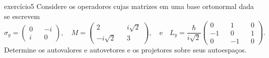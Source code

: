 \begin{exercício}{}{exercício5}
    Considere os operadores cujas matrizes em uma base ortonormal dada se escrevem
    \begin{equation*}
        \sigma_y = \begin{pmatrix}
            0 && -i\\
            i && 0
        \end{pmatrix},
        \quad
        M = \begin{pmatrix}
            2 && i \sqrt{2}\\
            -i \sqrt{2} && 3
        \end{pmatrix},
        \quad\text{e}\quad
        L_y = \frac{\hbar}{i\sqrt{2}}\begin{pmatrix}
            0 && 1 && 0\\
            -1&& 0 && 1\\
            0 && -1&& 0
        \end{pmatrix}.
    \end{equation*}
    Determine os autovalores e autovetores e os projetores sobre seus autoespaços.
\end{exercício}
